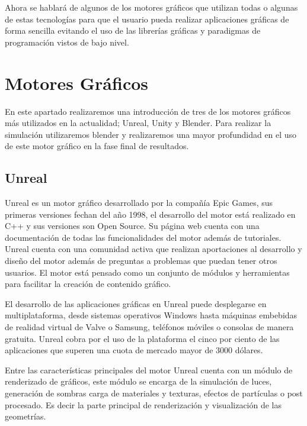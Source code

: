 \documentclass[a4paper, 17pt]{book}
\begin{document}
\vspace{1mm} %

Ahora se hablará de algunos de los motores gráficos que utilizan todas o algunas de estas
tecnologías para que el usuario pueda realizar aplicaciones gráficas de forma sencilla evitando
el uso de las librerías gráficas y paradigmas de programación vistos de bajo nivel.

\section{Motores Gráficos} 
\label{sec:Motores}

En este apartado realizaremos una introducción de tres de los motores gráficos más utilizados
en la actualidad; Unreal, Unity y Blender. Para realizar la simulación utilizaremos blender y
realizaremos una mayor profundidad en el uso de este motor gráfico en la fase final de resultados.

\subsection{Unreal} 
\label{subsec:Unreal}

Unreal es un motor gráfico desarrollado por la compañía Epic Games, sus primeras versiones fechan del año
1998, el desarrollo del motor está realizado en C++ y sus versiones son Open Source. Su página web cuenta
con una documentación de todas las funcionalidades del motor además de tutoriales. Unreal cuenta con una
comunidad activa que realizan aportaciones al desarrollo y diseño del motor además de preguntas a problemas
que puedan tener otros usuarios. El motor está pensado como un conjunto de módulos y herramientas para
facilitar la creación de contenido gráfico.

\vspace{1mm} %

El desarrollo de las aplicaciones gráficas en Unreal puede desplegarse en multiplataforma, desde sistemas
operativos Windows hasta máquinas embebidas de realidad virtual de Valve o Samsung, teléfonos móviles o
consolas de manera gratuita. Unreal cobra por el uso de la plataforma el cinco por ciento de las aplicaciones que
superen una cuota de mercado mayor de 3000 dólares.

\vspace{1mm} %

Entre las características principales del motor Unreal cuenta con un módulo de renderizado de gráficos, este
módulo se encarga de la simulación de luces, generación de sombras carga de materiales y texturas, efectos
de partículas o post procesado. Es decir la parte principal de renderización y visualización de las geometrías.
\end{document}
